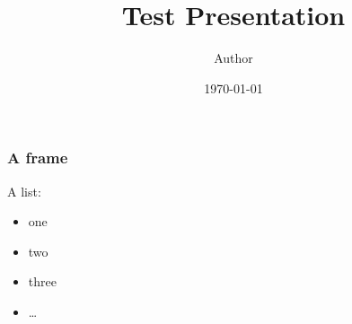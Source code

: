 \documentclass{beamer}
\title{Test Presentation}
\author{Author}
\institute{My institute}
\date[\tiny\today]{\scriptsize\today}
\begin{document}
\begin{frame}
  \titlepage
\end{frame}

\begin{frame}
  \frametitle{A frame}
  A list:
  \begin{itemize}
    \item one
    \item two
    \item three
    \item \ldots
  \end{itemize}
\end{frame}
\end{document}
